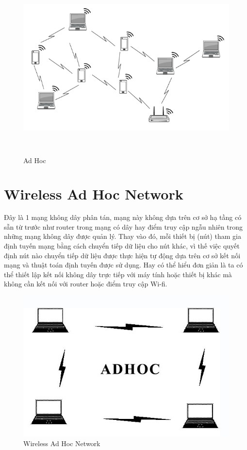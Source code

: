 \documentclass[12pt,a4paper]{report}
\begin{document}
\begin{figure}[h]
	\begin{center}
		\includegraphics[scale=0.6]{ad_hoc.png}	
	\end{center}
	\caption{Ad Hoc}
	\label{refhinh1.1}\
\end{figure}

\section{Wireless Ad Hoc Network}
\hspace{25pt} Đây là 1 mạng không dây phân tán, mạng này không dựa trên cơ sở hạ tầng có sẵn từ trước như router trong mạng có dây hay điểm truy cập ngẫu nhiên trong những mạng không dây được quản lý. Thay vào đó, mỗi thiết bị (nút) tham gia định tuyến mạng bằng cách chuyển tiếp dữ liệu cho nút khác, vì thế việc quyết định nút nào chuyển tiếp dữ liệu được thực hiện tự động dựa trên cơ sở kết nối mạng và thuật toán định tuyến được sử dụng. Hay có thể hiểu đơn giản là ta có thể thiết lập kết nối không dây trực tiếp với máy tính hoặc thiết bị khác mà không cần kết nối với router hoặc điểm truy cập Wi-fi.
\begin{figure}[h]
	\begin{center}
			\includegraphics[scale=.6]{Ad.png}
	\end{center}
	\caption{Wireless Ad Hoc Network}
	\label{refhinh1.2}
\end{figure}
\end{document}

